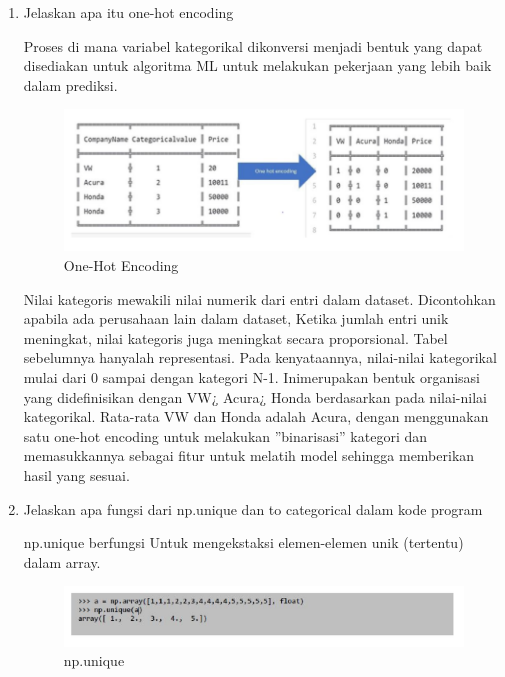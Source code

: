 \begin{enumerate}
\item Jelaskan apa itu one-hot encoding
\par Proses di mana variabel kategorikal dikonversi menjadi bentuk yang dapat disediakan untuk algoritma ML untuk melakukan pekerjaan yang lebih baik dalam prediksi.
\begin{figure}[H]
\centering
\includegraphics[scale=0.3]{figures/1174057/chapter6/6_1.PNG}
\caption{One-Hot Encoding }
\label{One-Hot Encoding }
\end{figure}

\par Nilai kategoris mewakili nilai numerik dari entri dalam dataset. Dicontohkan apabila ada perusahaan lain dalam dataset, Ketika jumlah entri unik meningkat, nilai kategoris juga meningkat secara proporsional. Tabel sebelumnya hanyalah representasi. Pada kenyataannya, nilai-nilai kategorikal mulai dari 0 sampai dengan kategori N-1. Inimerupakan bentuk organisasi yang dideﬁnisikan dengan VW¿ Acura¿ Honda berdasarkan pada nilai-nilai kategorikal. Rata-rata VW dan Honda adalah Acura, dengan menggunakan satu one-hot encoding untuk melakukan ”binarisasi” kategori dan memasukkannya sebagai ﬁtur untuk melatih model sehingga memberikan hasil yang sesuai.

\item Jelaskan apa fungsi dari np.unique dan to categorical dalam kode program
\par np.unique berfungsi Untuk mengekstaksi elemen-elemen unik (tertentu) dalam array.
\begin{figure}[H]
\centering
\includegraphics[scale=0.4]{figures/1174057/chapter6/7_1.PNG}
\caption{np.unique}
\label{np.unique}
\end{figure}


\end{enumerate}
